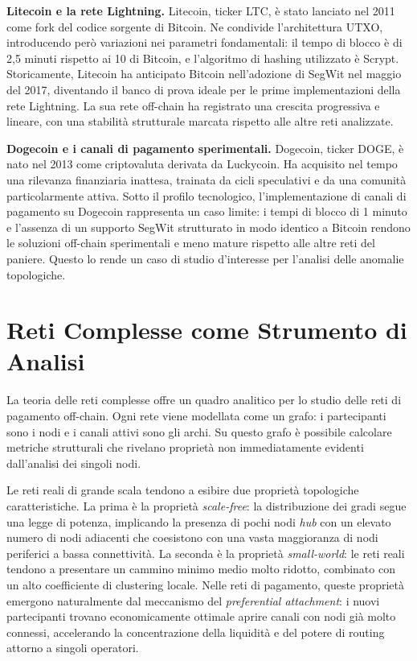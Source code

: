 \documentclass[12pt,a4paper,oneside]{book}
\begin{document}
\textbf{Litecoin e la rete Lightning.} Litecoin, ticker LTC, è stato lanciato nel 2011 come fork del codice sorgente di Bitcoin. Ne condivide l'architettura UTXO, introducendo però variazioni nei parametri fondamentali: il tempo di blocco è di 2,5 minuti rispetto ai 10 di Bitcoin, e l'algoritmo di hashing utilizzato è Scrypt. Storicamente, Litecoin ha anticipato Bitcoin nell'adozione di SegWit nel maggio del 2017, diventando il banco di prova ideale per le prime implementazioni della rete Lightning. La sua rete off-chain ha registrato una crescita progressiva e lineare, con una stabilità strutturale marcata rispetto alle altre reti analizzate.

\textbf{Dogecoin e i canali di pagamento sperimentali.} Dogecoin, ticker DOGE, è nato nel 2013 come criptovaluta derivata da Luckycoin. Ha acquisito nel tempo una rilevanza finanziaria inattesa, trainata da cicli speculativi e da una comunità particolarmente attiva. Sotto il profilo tecnologico, l'implementazione di canali di pagamento su Dogecoin rappresenta un caso limite: i tempi di blocco di 1 minuto e l'assenza di un supporto SegWit strutturato in modo identico a Bitcoin rendono le soluzioni off-chain sperimentali e meno mature rispetto alle altre reti del paniere. Questo lo rende un caso di studio d'interesse per l'analisi delle anomalie topologiche.

\section{Reti Complesse come Strumento di Analisi}

La teoria delle reti complesse offre un quadro analitico per lo studio delle reti di pagamento off-chain. Ogni rete viene modellata come un grafo: i partecipanti sono i nodi e i canali attivi sono gli archi. Su questo grafo è possibile calcolare metriche strutturali che rivelano proprietà non immediatamente evidenti dall'analisi dei singoli nodi.

Le reti reali di grande scala tendono a esibire due proprietà topologiche caratteristiche. La prima è la proprietà \textit{scale-free}: la distribuzione dei gradi segue una legge di potenza, implicando la presenza di pochi nodi \textit{hub} con un elevato numero di nodi adiacenti che coesistono con una vasta maggioranza di nodi periferici a bassa connettività. La seconda è la proprietà \textit{small-world}: le reti reali tendono a presentare un cammino minimo medio molto ridotto, combinato con un alto coefficiente di clustering locale. Nelle reti di pagamento, queste proprietà emergono naturalmente dal meccanismo del \textit{preferential attachment}: i nuovi partecipanti trovano economicamente ottimale aprire canali con nodi già molto connessi, accelerando la concentrazione della liquidità e del potere di routing attorno a singoli operatori.
\end{document}
